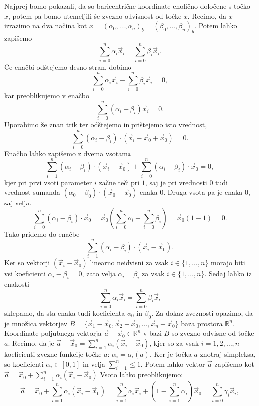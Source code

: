 \documentclass[mat1]{fmfdelo}
\newcommand{\R}{\mathbb R}
\newcommand{\0}{\underline{0}}
\begin{document}
\begin{dokaz}
Najprej bomo pokazali, da so baricentrične koordinate enolično določene s točko $x$, potem pa bomo utemeljili še zvezno odvisnost od točke $x$. Recimo, da $x$ izrazimo na dva načina kot $x = \left (\alpha_0, \dots, \alpha_n \right )_b = \left (\beta_0, \dots, \beta_n \right )_b$. Potem lahko zapišemo 
$$\sum_{i=0}^n \alpha_i \vec{x}_i = \sum_{i=0}^n \beta_i \vec{x}_i.$$
Če enačbi odštejemo desno stran, dobimo 
$$\sum_{i=0}^n \alpha_i \vec{x}_i - \sum_{i=0}^n \beta_i \vec{x}_i = 0,$$
kar preoblikujemo v enačbo
$$\sum_{i=0}^n (\alpha_i - \beta_i) \vec{x}_i  = 0.$$
Uporabimo že znan trik ter odštejemo in prištejemo isto vrednost,
$$\sum_{i=0}^n (\alpha_i  - \beta_i) \cdot (\vec{x}_i - \vec{x}_0 + \vec{x}_0) = 0.$$
Enačbo lahko zapišemo z dvema vsotama
$$\sum_{i=1}^n (\alpha_i  - \beta_i) \cdot (\vec{x}_i -\vec{x}_0) + \sum_{i=0}^n (\alpha_i  - \beta_i) \cdot \vec{x}_0= 0,$$
kjer pri prvi vsoti parameter $i$ začne teči pri $1$, saj je pri vrednosti $0$ tudi vrednost sumanda  $(\alpha_0 - \beta_0) \cdot (\vec{x}_0 -\vec{x}_0)$ enaka $0$. Druga vsota pa je enaka $0$, saj velja:
$$\sum_{i=0}^n (\alpha_i  - \beta_i) \cdot \vec{x}_0= \vec{x}_0 \left (\sum_{i=0}^n \alpha_i  - \sum_{i=0}^n \beta_i \right) = \vec{x}_0 (1 - 1)= 0.$$
Tako pridemo do enačbe 
$$\sum_{i=1}^n (\alpha_i  - \beta_i) \cdot (\vec{x}_i - \vec{x}_0).$$
Ker so vektorji $(\vec{x}_i - \vec{x}_0)$ linearno neidvisni za vsak $i \in \{ 1, \dots, n \}$ morajo biti vsi koeficienti $\alpha_i  - \beta_i = 0$, zato velja $\alpha_i  = \beta_i$ za vsak $i \in \{ 1, \dots, n \}$. Sedaj lahko iz enakosti
$$\sum_{i=0}^n \alpha_i \vec{x}_i = \sum_{i=0}^n \beta_i \vec{x}_i$$
sklepamo, da sta enaka tudi koeficienta $\alpha_0$ in $\beta_0$.
Za dokaz zveznosti opazimo, da je množica vektorjev $B = \{ \vec{x}_1 - \vec{x}_0, \vec{x}_2 - \vec{x}_0, \dots, \vec{x}_{n} - \vec{x}_0 \}$ baza prostora $\R^n$. Koordinate poljubnega vektorja $\vec{a} - \vec{x}_0 \in \R^n$ v bazi $B$ so zvezno odvisne od  točke $a$. Recimo, da je $\vec{a} - \vec{x}_0 = \sum\limits_{i=1}^n \alpha_i (\vec{x}_i - \vec{x}_0)$, kjer so za vsak $i = 1, 2, \dots, n$ koeficienti zvezne funkcije točke $a$: $\alpha_i = \alpha_i(a)$. Ker je točka $a$ znotraj simpleksa, so koeficienti $\alpha_i \in [0, 1]$ in velja $\sum\limits_{i=1}^n \leq 1$. Potem lahko vektor $\vec{a}$ zapišemo kot $\vec{a}= \vec{x}_0 + \sum\limits_{i=1}^n \alpha_i (\vec{x}_i - \vec{x}_0)$ Vsoto lahko preoblikujemo:
$$\vec{a}= \vec{x}_0 +  \sum_{i=1}^n \alpha_i (\vec{x}_i - \vec{x}_0) = \sum_{i=1}^n \alpha_i \vec{x}_i +(1 - \sum_{i=1}^n \alpha_i ) \vec{x}_0 = \sum_{i=0}^n \gamma_i \vec{x}_i,$$

\end{dokaz}
\end{document}
